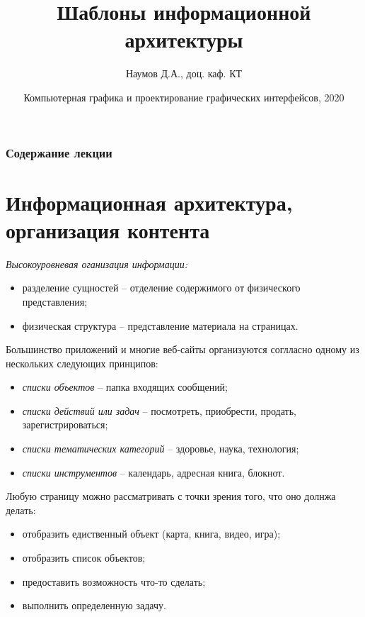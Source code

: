 \documentclass{beamer}
\title[Шаблоны]{Шаблоны информационной архитектуры}
\author{Наумов Д.А., доц. каф. КТ}
\date[18.11.2020] {Компьютерная графика и проектирование графических интерфейсов, 2020}
\begin{document}
\begin{frame}
  \titlepage
\end{frame}
  
\begin{frame}
  \frametitle{Содержание лекции}
  \tableofcontents  
\end{frame}

\section{Информационная архитектура, организация контента}

\begin{frame}[t]
	\textit{Высокоуровневая оганизация информации:}
	\begin{itemize}
		\item разделение сущностей -- отделение содержимого от физического представления;
		\item физическая структура -- представление материала на страницах.
	\end{itemize}
	
	Большинство приложений и многие веб-сайты организуются соглласно одному из нескольких следующих принципов:
	\begin{itemize}
		\item \textit{списки объектов} -- папка входящих сообщений;
		\item \textit{списки действий или задач} -- посмотреть, приобрести, продать, зарегистрироваться; 		
		\item \textit{списки тематических категорий} -- здоровье, наука, технология;		
		\item \textit{списки инструментов} -- календарь, адресная книга, блокнот.		
	\end{itemize}
	
	Любую страницу можно рассматривать с точки зрения того, что оно долнжа делать:
	\begin{itemize}
		\item отобразить едиственный объект (карта, книга, видео, игра);
		\item отобразить список объектов;
		\item предоставить возможность что-то сделать;
		\item выполнить определенную задачу.				
	\end{itemize}	

\end{frame} 
\end{document}
